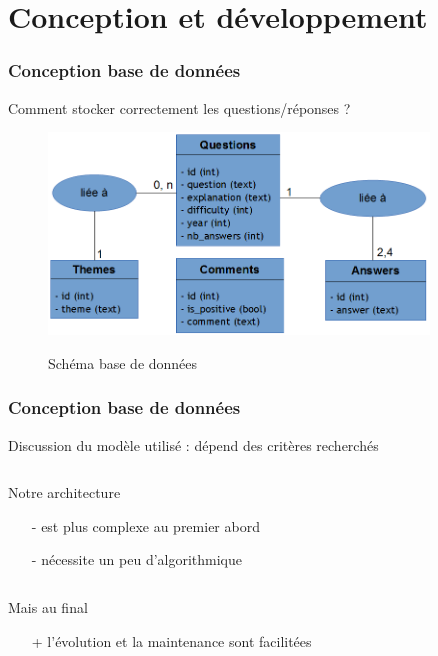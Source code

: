 \section{Conception et développement}

\begin{frame}
\tableofcontents[currentsection]
\end{frame}

\begin{frame}
	\frametitle{Conception base de données}
	Comment stocker correctement les questions/réponses ?
	
	\begin{figure}[!h]
		\centering
			\includegraphics[width = 0.9\textwidth]{conception/bdd.png}
		\label{Schéma base de données} 
		\caption{Schéma base de données}
	\end{figure}
\end{frame}

\begin{frame}
	\frametitle{Conception base de données}
	Discussion du modèle utilisé : dépend des critères recherchés
		
	\bigskip

	\begin{columns}[t]
		\begin{column}{10cm}
			\begin{exampleblock}{Notre architecture}
				\begin{itemize}
					\item[-] est plus complexe au premier abord
					\item[-] nécessite un peu d'algorithmique
				\end{itemize}
			\end{exampleblock} 
		\end{column}
	\end{columns}
	
	\begin{columns}[t]
		\begin{column}{10cm}
			\begin{exampleblock}{Mais au final}
				\begin{itemize}
					\item[+] l'évolution et la maintenance sont facilitées
				\end{itemize}
			\end{exampleblock} 
		\end{column}
	\end{columns}
\end{frame}

